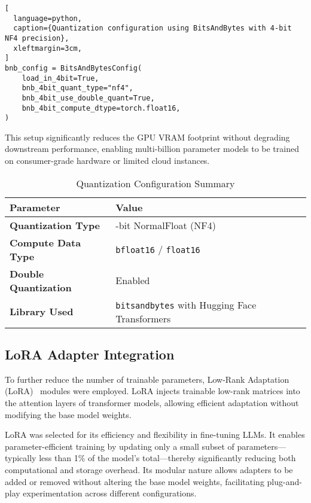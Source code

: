 \begin{lstlisting}[
  language=python,
  caption={Quantization configuration using BitsAndBytes with 4-bit NF4 precision},
  xleftmargin=3cm,
]
bnb_config = BitsAndBytesConfig(
    load_in_4bit=True,
    bnb_4bit_quant_type="nf4",
    bnb_4bit_use_double_quant=True,
    bnb_4bit_compute_dtype=torch.float16,
)
\end{lstlisting}

This setup significantly reduces the GPU VRAM footprint without degrading downstream
performance, enabling multi-billion parameter models to be trained on consumer-grade
hardware or limited cloud instances.

\begin{table}[H]
  \centering
  \scriptsize
  \renewcommand{\arraystretch}{1.3}
  \begin{tabularx}{0.95\textwidth}{
    >{\raggedright\arraybackslash}p{5cm}
    >{\centering\arraybackslash}X
  }
    \toprule
    \textbf{Parameter} & \textbf{Value} \\
    \midrule
    \textbf{Quantization Type} & 4-bit NormalFloat (NF4) \\
    \textbf{Compute Data Type} & \texttt{bfloat16} / \texttt{float16} \\
    \textbf{Double Quantization} & Enabled \\
    \textbf{Library Used} & \texttt{bitsandbytes} with Hugging Face Transformers \\
    \bottomrule
  \end{tabularx}
  \caption{Quantization Configuration Summary}
\end{table}

\subsection{LoRA Adapter Integration}

To further reduce the number of trainable parameters, Low-Rank Adaptation (LoRA)~\cite{hu2022lora}
modules were employed. LoRA injects trainable low-rank matrices into the attention
layers of transformer models, allowing efficient adaptation without modifying the base
model weights.

LoRA was selected for its efficiency and flexibility in fine-tuning LLMs. It enables
parameter-efficient training by updating only a small subset of parameters—typically less
than 1\% of the model's total—thereby significantly reducing both computational and
storage overhead. Its modular nature allows adapters to be added or removed without
altering the base model weights, facilitating plug-and-play experimentation across
different configurations.

